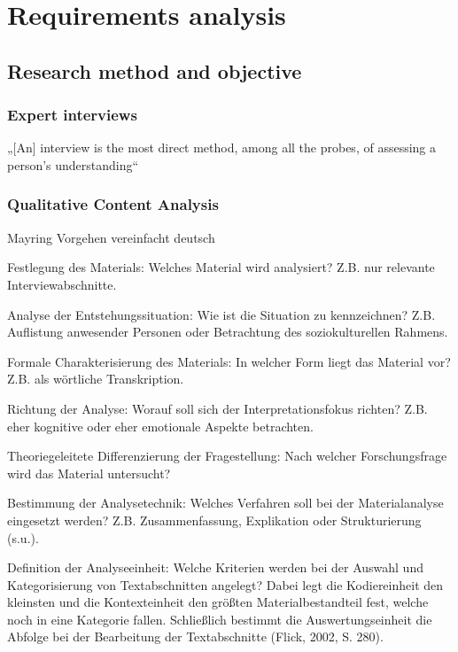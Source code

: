 \section{Requirements analysis}


\subsection{Research method and objective}

\subsubsection{Expert interviews}

„[An] interview is the most direct method, among all the probes, of assessing a person’s understanding“ \cite{WhiteProbingunderstanding1992}

\subsubsection{Qualitative Content Analysis}

Mayring Vorgehen vereinfacht deutsch

Festlegung des Materials: Welches Material wird analysiert? Z.B. nur relevante Interviewabschnitte.

Analyse der Entstehungssituation: Wie ist die Situation zu kenn­zeichnen? Z.B. Auflistung anwesender Personen oder Betrachtung des soziokulturellen Rahmens.

Formale Charakterisierung des Materials: In welcher Form liegt das Material vor? Z.B. als wörtliche Transkription.

Richtung der Analyse: Worauf soll sich der Interpretationsfokus richten? Z.B. eher kognitive oder eher emotionale Aspekte be­trachten.

Theoriegeleitete Differenzierung der Fragestellung: Nach welcher Forschungsfrage wird das Material untersucht?

Bestimmung der Analysetechnik: Welches Verfahren soll bei der Materialanalyse eingesetzt werden? Z.B. Zusammenfassung, Explikation oder Strukturierung (s.u.).

Definition der Analyseeinheit: Welche Kriterien werden bei der Auswahl und Kategorisierung von Textabschnitten angelegt? Dabei legt die Kodiereinheit den kleinsten und die Kontexteinheit den größten Materialbestandteil fest, welche noch in eine Kategorie fallen. Schließlich bestimmt die Auswertungseinheit die Abfolge bei der Bearbeitung der Textabschnitte (Flick, 2002, S. 280).

